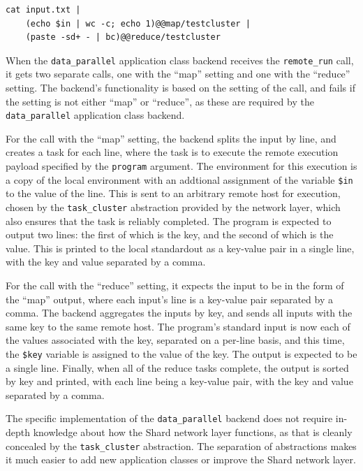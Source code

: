 \documentclass[twoside]{report}
\begin{document}
\begin{minipage}[c]{\textwidth-15pt}
  \begin{lstlisting}[language=shard]
cat input.txt |
    (echo $in | wc -c; echo 1)@@map/testcluster |
    (paste -sd+ - | bc)@@reduce/testcluster
\end{lstlisting}
  \smallskip
\end{minipage}

When the \texttt{data\_parallel} application class backend receives the \texttt{remote\_run} call, it gets two separate calls, one with the ``map'' setting and one with the ``reduce'' setting.
The backend's functionality is based on the setting of the call, and fails if the setting is not either ``map'' or ``reduce'', as these are required by the \texttt{data\_parallel} application class backend.

For the call with the ``map'' setting, the backend splits the input by line, and creates a task for each line, where the task is to execute the remote execution payload specified by the \texttt{program} argument.
The environment for this execution is a copy of the local environment with an addtional assignment of the variable \texttt{\$in} to the value of the line.
This is sent to an arbitrary remote host for execution, chosen by the \texttt{task\_cluster} abstraction provided by the network layer, which also ensures that the task is reliably completed.
The program is expected to output two lines: the first of which is the key, and the second of which is the value.
This is printed to the local standardout as a key-value pair in a single line, with the key and value separated by a comma.

For the call with the ``reduce'' setting, it expects the input to be in the form of the ``map'' output, where each input's line is a key-value pair separated by a comma.
The backend aggregates the inputs by key, and sends all inputs with the same key to the same remote host.
The program's standard input is now each of the values associated with the key, separated on a per-line basis, and this time, the \texttt{\$key} variable is assigned to the value of the key.
The output is expected to be a single line.
Finally, when all of the reduce tasks complete, the output is sorted by key and printed, with each line being a key-value pair, with the key and value separated by a comma.

The specific implementation of the \texttt{data\_parallel} backend does not require in-depth knowledge about how the Shard network layer functions, as that is cleanly concealed by the \texttt{task\_cluster} abstraction.
The separation of abstractions makes it much easier to add new application classes or improve the Shard network layer.
\end{document}
